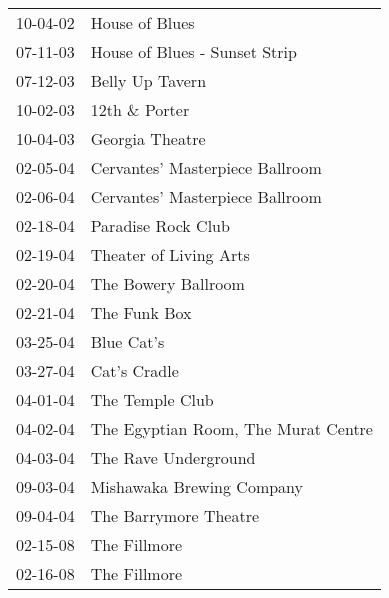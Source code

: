 \begin{supertabular}{p{0.25\columnwidth}p{0.75\columnwidth}}
 10-04-02 &                       House of Blues \\
 07-11-03 &        House of Blues - Sunset Strip \\
 07-12-03 &                      Belly Up Tavern \\
 10-02-03 &                        12th \& Porter \\
 10-04-03 &                      Georgia Theatre \\
 02-05-04 &      Cervantes' Masterpiece Ballroom \\
 02-06-04 &      Cervantes' Masterpiece Ballroom \\
 02-18-04 &                   Paradise Rock Club \\
 02-19-04 &               Theater of Living Arts \\
 02-20-04 &                  The Bowery Ballroom \\
 02-21-04 &                         The Funk Box \\
 03-25-04 &                           Blue Cat's \\
 03-27-04 &                         Cat's Cradle \\
 04-01-04 &                      The Temple Club \\
 04-02-04 &  The Egyptian Room, The Murat Centre \\
 04-03-04 &                 The Rave Underground \\
 09-03-04 &            Mishawaka Brewing Company \\
 09-04-04 &                The Barrymore Theatre \\
 02-15-08 &                         The Fillmore \\
 02-16-08 &                         The Fillmore \\
\end{supertabular}
